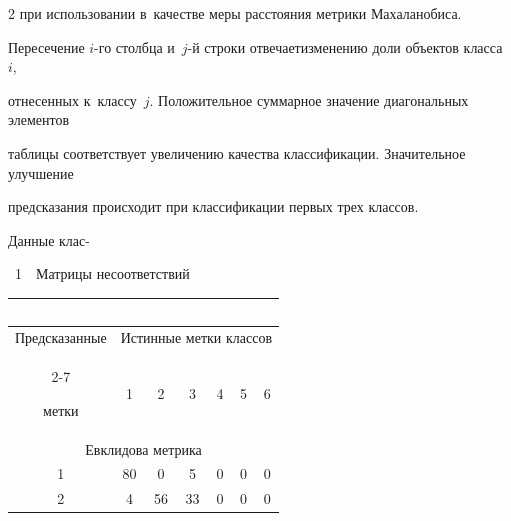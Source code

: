 \begin{multicols}{2}
при использовании в~качестве меры расстояния метрики Махаланобиса.


Пересече\-ние $i$-го столбца и~$j$-й строки отвечает\linebreak изменению доли объектов класса~$i$, 


отнесенных к~классу~$j$. Положительное суммарное значе\-ние диагональных элементов 


таблицы соответствует увеличению качества классификации. Значительное улучшение 


предсказания происходит при классификации первых трех классов.


Данные клас-\linebreak





\noindent


 \begin{center}  %


 \vspace*{-12pt}


{{\tablename~1}\ \ \small{Матрицы несоответствий}}





{\small 


\tabcolsep=4pt


\begin{tabular}{|c|c|c|c|c|c|c|}


\multicolumn{7}{c}{\ }\\[-6pt]


    \hline


 Предсказанные& \multicolumn{6}{c|}{Истинные метки классов}\\


  \cline{2-7}


   метки& 1  & 2  & 3  & 4  & 5  & 6  \\ 


   \hline


   \multicolumn{7}{|c|}{Евклидова метрика}\\


   \hline


1  & 80\hphantom{9} & \hphantom{9}0  & \hphantom{9}5  & \hphantom{9}0  & \hphantom{9}0  & \hphantom{9}0   \\




2  & 4  & 56 & 33 & \hphantom{9}0  & \hphantom{9}0  & \hphantom{9}0  \\



\end{tabular}}
\end{center}
\end{multicols}
